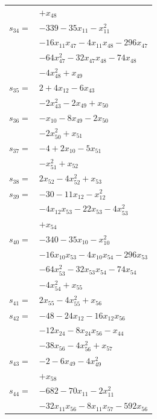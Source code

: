 \begin{longtable}{@{}r@{\;}l@{}}
 & \(\displaystyle +x_{48}\) \\[3pt]
\(s_{34}=\) & \(\displaystyle -339 -35x_{11} -x_{11}^{2}\) \\
 & \(\displaystyle -16x_{11}x_{47} -4x_{11}x_{48} -296x_{47}\) \\
 & \(\displaystyle -64x_{47}^{2} -32x_{47}x_{48} -74x_{48}\) \\
 & \(\displaystyle -4x_{48}^{2} +x_{49}\) \\[3pt]
\(s_{35}=\) & \(\displaystyle 2 +4x_{12} -6x_{43}\) \\
 & \(\displaystyle -2x_{43}^{2} -2x_{49} +x_{50}\) \\[3pt]
\(s_{36}=\) & \(\displaystyle -x_{10} -8x_{49} -2x_{50}\) \\
 & \(\displaystyle -2x_{50}^{2} +x_{51}\) \\[3pt]
\(s_{37}=\) & \(\displaystyle -4 +2x_{10} -5x_{51}\) \\
 & \(\displaystyle -x_{51}^{2} +x_{52}\) \\[3pt]
\(s_{38}=\) & \(\displaystyle 2x_{52} -4x_{52}^{2} +x_{53}\) \\[3pt]
\(s_{39}=\) & \(\displaystyle -30 -11x_{12} -x_{12}^{2}\) \\
 & \(\displaystyle -4x_{12}x_{53} -22x_{53} -4x_{53}^{2}\) \\
 & \(\displaystyle +x_{54}\) \\[3pt]
\(s_{40}=\) & \(\displaystyle -340 -35x_{10} -x_{10}^{2}\) \\
 & \(\displaystyle -16x_{10}x_{53} -4x_{10}x_{54} -296x_{53}\) \\
 & \(\displaystyle -64x_{53}^{2} -32x_{53}x_{54} -74x_{54}\) \\
 & \(\displaystyle -4x_{54}^{2} +x_{55}\) \\[3pt]
\(s_{41}=\) & \(\displaystyle 2x_{55} -4x_{55}^{2} +x_{56}\) \\[3pt]
\(s_{42}=\) & \(\displaystyle -48 -24x_{12} -16x_{12}x_{56}\) \\
 & \(\displaystyle -12x_{24} -8x_{24}x_{56} -x_{44}\) \\
 & \(\displaystyle -38x_{56} -4x_{56}^{2} +x_{57}\) \\[3pt]
\(s_{43}=\) & \(\displaystyle -2 -6x_{49} -4x_{49}^{2}\) \\
 & \(\displaystyle +x_{58}\) \\[3pt]
\(s_{44}=\) & \(\displaystyle -682 -70x_{11} -2x_{11}^{2}\) \\
 & \(\displaystyle -32x_{11}x_{56} -8x_{11}x_{57} -592x_{56}\) \\

\end{longtable}
